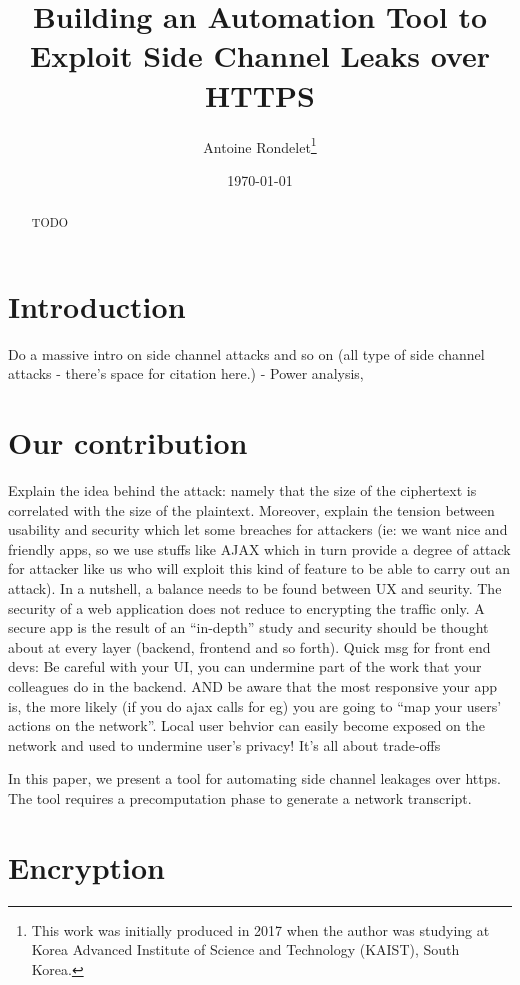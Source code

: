 \documentclass[runningheads]{llncs}
\title{Building an Automation Tool to Exploit Side Channel Leaks over HTTPS}
\author{Antoine Rondelet\thanks{This work was initially produced in 2017 when the author was studying at Korea Advanced Institute of Science and Technology (KAIST), South Korea.}}
\institute{%
    \email{rondelet.antoine@gmail.com}
}
\date{\today}
\begin{document}
\maketitle

\begin{abstract}

TODO

\end{abstract}

\section{Introduction}

Do a massive intro on side channel attacks and so on (all type of side channel attacks - there's space for citation here.)
- Power analysis,

\section{Our contribution}

Explain the idea behind the attack: namely that the size of the ciphertext is correlated with the size of the plaintext.
Moreover, explain the tension between usability and security which let some breaches for attackers (ie: we want nice and friendly apps, so we use stuffs like AJAX which in turn provide a degree of attack for attacker like us who will exploit this kind of feature to be able to carry out an attack).
In a nutshell, a balance needs to be found between UX and seurity.
The security of a web application does not reduce to encrypting the traffic only. A secure app is the result of an ``in-depth'' study and security should be thought about at every layer (backend, frontend and so forth). Quick msg for front end devs: Be careful with your UI, you can undermine part of the work that your colleagues do in the backend. AND be aware that the most responsive your app is, the more likely (if you do ajax calls for eg) you are going to  ``map your users' actions on the network''. Local user behvior can easily become exposed on the network and used to undermine user's privacy! It's all about trade-offs

In this paper, we present a tool for automating side channel leakages over https. The tool requires a precomputation phase to generate a network transcript.

\section{Encryption}
\end{document}
